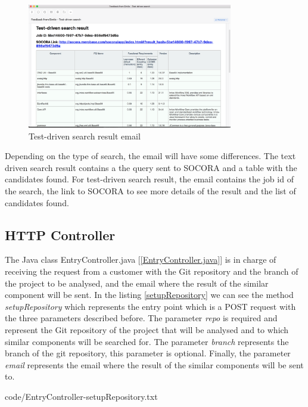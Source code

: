 \begin{figure}[H]
	\centering
    \includegraphics[width=0.8\textwidth]{grafiken/email-02}
    \caption{Test-driven search result email}
    \label{fig:email-02}
\end{figure}

Depending on the type of search, the email will have some differences. The text driven search result contains a the query sent to SOCORA and a table with the candidates found. For test-driven search result, the email contains the job id of the search, the link to SOCORA to see more details of the result and the list of candidates found.

\subsection{HTTP Controller}
The Java class EntryController.java [\ref{EntryController.java}] is in charge of receiving the request from a customer with the Git repository and the branch of the project to be analysed, and the email where the result of the similar component will be sent. In the listing \ref{setupRepository} we can see the method \emph{setupRepository} which represents the entry point which is a POST request with the three parameters described before. The parameter \emph{repo} is required and represent the Git repository of the project that will be analysed and to which similar components will be searched for. The parameter \emph{branch} represents the branch of the git repository, this parameter is optional. Finally, the parameter \emph{email} represents the email where the result of the similar components will be sent to.


{code/EntryController-setupRepository.txt}

